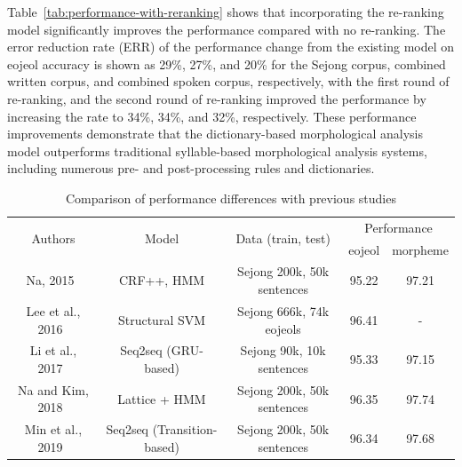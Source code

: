 \documentclass[AMS,STIX2COL]{WileyNJD-v2}
\begin{document}
    Table~\ref{tab:performance-with-reranking} shows that incorporating the re-ranking model significantly improves the performance compared with no re-ranking.
    The error reduction rate (ERR) of the performance change from the existing model on eojeol accuracy is shown as 29\%, 27\%, and 20\% for the Sejong corpus, combined written corpus, and combined spoken corpus, respectively, with the first round of re-ranking, and the second round of re-ranking improved the performance by increasing the rate to 34\%, 34\%, and 32\%, respectively.
    These performance improvements demonstrate that the dictionary-based morphological analysis model outperforms traditional syllable-based morphological analysis systems, including numerous pre- and post-processing rules and dictionaries.

    \begin{table}[]
        \caption{Comparison of performance differences with previous studies}\label{tab:differences-with-previous-studies}
        \begin{tabular*}{500pt}{@{\extracolsep\fill}ccc|cc@{\extracolsep\fill}}
            \toprule
            \multirow{2}{*}{Authors} & \multirow{2}{*}{Model} & \multirow{2}{*}{Data (train, test)} & \multicolumn{2}{c}{Performance} \\
            \cmidrule{4-5}
            ~                                     & ~                                          & ~                                           & \multicolumn{1}{c}{eojeol} & \multicolumn{1}{c}{morpheme} \\
            \midrule
            Na, 2015~\cite{NaSH2015}              & CRF++, HMM                                 & Sejong 200k, 50k sentences                  & 95.22                      & 97.21                        \\
            Lee et al., 2016~\cite{LeeCH2016}     & Structural SVM                             & Sejong 666k, 74k eojeols                    & 96.41                      & -                            \\
            Li et al., 2017~\cite{Li2017}         & Seq2seq (GRU-based)                        & Sejong 90k, 10k sentences                   & 95.33                      & 97.15                        \\
            Na and Kim, 2018~\cite{NaSH2018}      & Lattice + HMM                              & Sejong 200k, 50k sentences                  & 96.35                      & 97.74                        \\
            Min et al., 2019~\cite{MinJW2019}     & Seq2seq (Transition-based)                 & Sejong 200k, 50k sentences                  & 96.34                      & 97.68                        \\

\end{tabular*}
\end{table}
\end{document}
